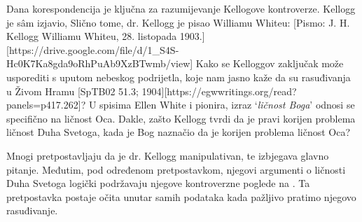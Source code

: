 Dana korespondencija je ključna za razumijevanje Kellogove kontroverze. Kellogg je sâm izjavio,  Slično tome, dr. Kellogg je pisao Williamu Whiteu: [Pismo: J. H. Kellogg Williamu Whiteu, 28. listopada 1903.][https://drive.google.com/file/d/1\_S4S-Hc0K7Ka8gda9oRhPuAb9XzBTwmb/view] Kako se Kelloggov zaključak može usporediti s uputom nebeskog podrijetla, koje nam jasno kaže da su rasuđivanja u Živom Hramu [SpTB02 51.3; 1904][https://egwwritings.org/read?panels=p417.262]? U spisima Ellen White i pionira, izraz ‘\textit{ličnost Boga}’ odnosi se specifično na ličnost Oca. Dakle, zašto Kellogg tvrdi da je pravi korijen problema ličnost Duha Svetoga, kada je Bog naznačio da je korijen problema ličnost Oca?

Mnogi pretpostavljaju da je dr. Kellogg manipulativan, te izbjegava glavno pitanje. Međutim, pod određenom pretpostavkom, njegovi argumenti o ličnosti Duha Svetoga logički podržavaju njegove kontroverzne poglede na . Ta pretpostavka postaje očita unutar samih podataka kada pažljivo pratimo njegovo rasuđivanje.

